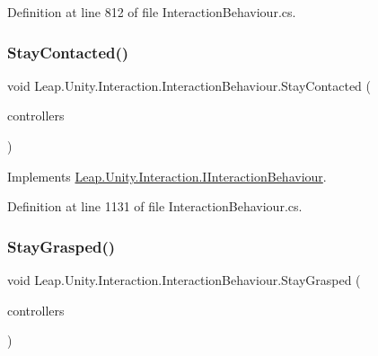 Definition at line 812 of file Interaction\+Behaviour.\+cs.

\mbox{\label{class_leap_1_1_unity_1_1_interaction_1_1_interaction_behaviour_a436494ab292bc5f759194d5ea68e077c}} 
\subsubsection{\texorpdfstring{StayContacted()}{StayContacted()}}
{\footnotesize\ttfamily void Leap.\+Unity.\+Interaction.\+Interaction\+Behaviour.\+Stay\+Contacted (\begin{DoxyParamCaption}\item[{List$<$ \mbox{\hyperlink{class_leap_1_1_unity_1_1_interaction_1_1_interaction_controller}{Interaction\+Controller}} $>$}]{controllers }\end{DoxyParamCaption})}



Implements \mbox{\hyperlink{interface_leap_1_1_unity_1_1_interaction_1_1_i_interaction_behaviour_a5a1fd5a7196c9252624de033c80b25f8}{Leap.\+Unity.\+Interaction.\+I\+Interaction\+Behaviour}}.



Definition at line 1131 of file Interaction\+Behaviour.\+cs.

\mbox{\label{class_leap_1_1_unity_1_1_interaction_1_1_interaction_behaviour_a47f9dce836cf928f2cb6885547f7afa8}} 
\subsubsection{\texorpdfstring{StayGrasped()}{StayGrasped()}}
{\footnotesize\ttfamily void Leap.\+Unity.\+Interaction.\+Interaction\+Behaviour.\+Stay\+Grasped (\begin{DoxyParamCaption}\item[{List$<$ \mbox{\hyperlink{class_leap_1_1_unity_1_1_interaction_1_1_interaction_controller}{Interaction\+Controller}} $>$}]{controllers }\end{DoxyParamCaption})}



